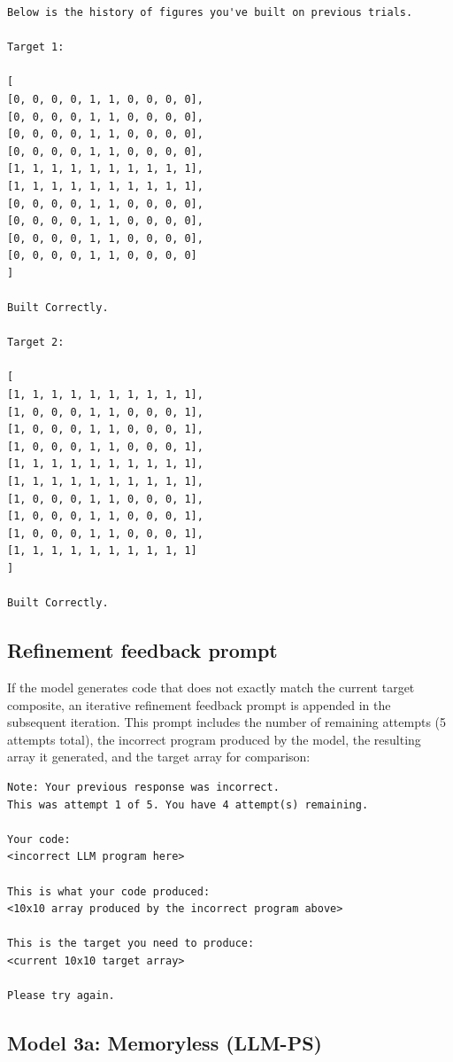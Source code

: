 \documentclass{article}
\begin{document}
\begin{verbatim}
Below is the history of figures you've built on previous trials.

Target 1:

[
[0, 0, 0, 0, 1, 1, 0, 0, 0, 0],
[0, 0, 0, 0, 1, 1, 0, 0, 0, 0],
[0, 0, 0, 0, 1, 1, 0, 0, 0, 0],
[0, 0, 0, 0, 1, 1, 0, 0, 0, 0],
[1, 1, 1, 1, 1, 1, 1, 1, 1, 1],
[1, 1, 1, 1, 1, 1, 1, 1, 1, 1],
[0, 0, 0, 0, 1, 1, 0, 0, 0, 0],
[0, 0, 0, 0, 1, 1, 0, 0, 0, 0],
[0, 0, 0, 0, 1, 1, 0, 0, 0, 0],
[0, 0, 0, 0, 1, 1, 0, 0, 0, 0]
]

Built Correctly.

Target 2:

[
[1, 1, 1, 1, 1, 1, 1, 1, 1, 1],
[1, 0, 0, 0, 1, 1, 0, 0, 0, 1],
[1, 0, 0, 0, 1, 1, 0, 0, 0, 1],
[1, 0, 0, 0, 1, 1, 0, 0, 0, 1],
[1, 1, 1, 1, 1, 1, 1, 1, 1, 1],
[1, 1, 1, 1, 1, 1, 1, 1, 1, 1],
[1, 0, 0, 0, 1, 1, 0, 0, 0, 1],
[1, 0, 0, 0, 1, 1, 0, 0, 0, 1],
[1, 0, 0, 0, 1, 1, 0, 0, 0, 1],
[1, 1, 1, 1, 1, 1, 1, 1, 1, 1]
]

Built Correctly.
\end{verbatim}

\subsection{Refinement feedback prompt}

If the model generates code that does not exactly match the current target composite, an iterative refinement feedback prompt is appended in the subsequent iteration. This prompt includes the number of remaining attempts (5 attempts total), the incorrect program produced by the model, the resulting array it generated, and the target array for comparison:

\begin{verbatim}
Note: Your previous response was incorrect. 
This was attempt 1 of 5. You have 4 attempt(s) remaining.

Your code:
<incorrect LLM program here>

This is what your code produced:
<10x10 array produced by the incorrect program above>

This is the target you need to produce:
<current 10x10 target array>

Please try again.
\end{verbatim}

\subsection{Model 3a: Memoryless (LLM-PS)}
\end{document}
